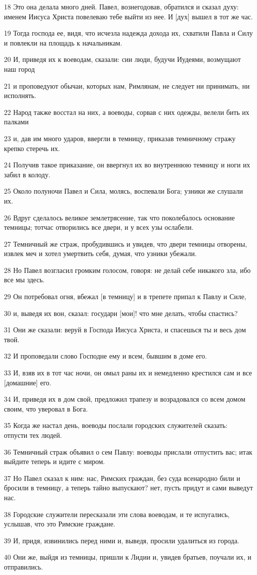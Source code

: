 \par 18 Это она делала много дней. Павел, вознегодовав, обратился и сказал духу: именем Иисуса Христа повелеваю тебе выйти из нее. И [дух] вышел в тот же час.
\par 19 Тогда господа ее, видя, что исчезла надежда дохода их, схватили Павла и Силу и повлекли на площадь к начальникам.
\par 20 И, приведя их к воеводам, сказали: сии люди, будучи Иудеями, возмущают наш город
\par 21 и проповедуют обычаи, которых нам, Римлянам, не следует ни принимать, ни исполнять.
\par 22 Народ также восстал на них, а воеводы, сорвав с них одежды, велели бить их палками
\par 23 и, дав им много ударов, ввергли в темницу, приказав темничному стражу крепко стеречь их.
\par 24 Получив такое приказание, он ввергнул их во внутреннюю темницу и ноги их забил в колоду.
\par 25 Около полуночи Павел и Сила, молясь, воспевали Бога; узники же слушали их.
\par 26 Вдруг сделалось великое землетрясение, так что поколебалось основание темницы; тотчас отворились все двери, и у всех узы ослабели.
\par 27 Темничный же страж, пробудившись и увидев, что двери темницы отворены, извлек меч и хотел умертвить себя, думая, что узники убежали.
\par 28 Но Павел возгласил громким голосом, говоря: не делай себе никакого зла, ибо все мы здесь.
\par 29 Он потребовал огня, вбежал [в темницу] и в трепете припал к Павлу и Силе,
\par 30 и, выведя их вон, сказал: государи [мои]! что мне делать, чтобы спастись?
\par 31 Они же сказали: веруй в Господа Иисуса Христа, и спасешься ты и весь дом твой.
\par 32 И проповедали слово Господне ему и всем, бывшим в доме его.
\par 33 И, взяв их в тот час ночи, он омыл раны их и немедленно крестился сам и все [домашние] его.
\par 34 И, приведя их в дом свой, предложил трапезу и возрадовался со всем домом своим, что уверовал в Бога.
\par 35 Когда же настал день, воеводы послали городских служителей сказать: отпусти тех людей.
\par 36 Темничный страж объявил о сем Павлу: воеводы прислали отпустить вас; итак выйдите теперь и идите с миром.
\par 37 Но Павел сказал к ним: нас, Римских граждан, без суда всенародно били и бросили в темницу, а теперь тайно выпускают? нет, пусть придут и сами выведут нас.
\par 38 Городские служители пересказали эти слова воеводам, и те испугались, услышав, что это Римские граждане.
\par 39 И, придя, извинились перед ними и, выведя, просили удалиться из города.
\par 40 Они же, выйдя из темницы, пришли к Лидии и, увидев братьев, поучали их, и отправились.


